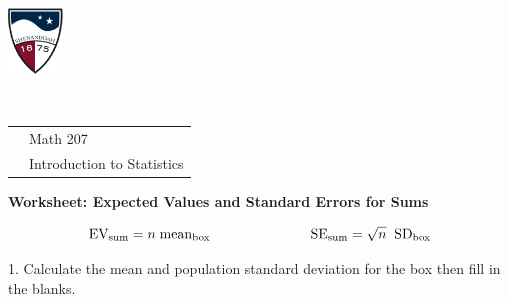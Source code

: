 \documentclass[10pt]{article}
\begin{document}
\pagestyle{empty}
\lstset{language=R, showspaces=false, showstringspaces=false}
\href{http://www.su.edu}{\includegraphics[height=1.75cm]{sulogo.eps}}
\vspace{-1.79cm}

{{\ }\hfill\small
\begin{tabular}{cl}
& Math 207\\
& Introduction to Statistics\\
\end{tabular}
}
\setlength{\baselineskip}{1.05\baselineskip}

\begin{center}
\textbf{\large  Worksheet:  Expected Values and Standard Errors for Sums}
\end{center}\vspace{-15pt}

\newcommand{\HH}{\hspace{20pt}\hphantom{a) } }
%
\newcommand{\twobox}[2]{\begin{pspicture}(-0.3,0.2)(2,1.3)
\psframe(0,0)(0.7,0.7)\rput(0.35,0.35){#1}
\psframe(1,0)(1.7,0.7)\rput(1.35,0.35){#2}
\psline(-0.3,0.9)(-0.3,-0.2)(2,-0.2)(2,0.9)(-0.3,0.9)
\end{pspicture}}
%
\newcommand{\threebox}[3]{\begin{pspicture}(0.2,0.2)(2.5,1.3)
\psframe(0,0)(0.7,0.7)\rput(0.35,0.35){#1}
\psframe(1,0)(1.7,0.7)\rput(1.35,0.35){#2}
\psframe(2,0)(2.7,0.7)\rput(2.35,0.35){#3}
\psline(-0.3,0.9)(-0.3,-0.2)(3,-0.2)(3,0.9)(-0.3,0.9)
\end{pspicture}}


\[\mbox{EV}_{\mbox{\scriptsize sum}} = n\;\mbox{mean}_{\mbox{\scriptsize box}}\hspace{1in}
  \mbox{SE}_{\mbox{\scriptsize sum}} = \sqrt{n}\;\;\mbox{SD}_{\mbox{\scriptsize box}}\]

1. Calculate the mean and population standard deviation for the box then fill in the blanks. \vspace{-5pt}
\end{document}
